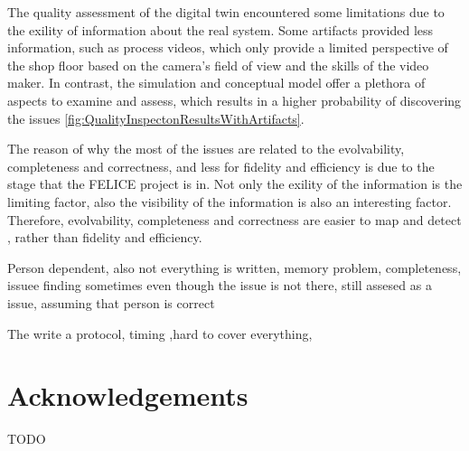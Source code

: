 \documentclass{llncs}
\begin{document}
    The quality assessment of the digital twin encountered some limitations due to the exility of information about the real system. Some artifacts provided less information, 
    such as process videos, which only provide a limited perspective of the shop floor based on the camera's field of view and the skills of the video maker. 
    In contrast, the simulation and conceptual model offer a plethora of aspects to examine and assess, which results in a higher probability of discovering the issues \ref{fig:QualityInspectonResultsWithArtifacts}.

    The reason of why the  most of the issues are related to the evolvability, 
    completeness and correctness, and less for fidelity and efficiency is due to the stage that the FELICE project is in. Not only the exility of the information is the limiting factor, also the visibility of the information 
    is also an interesting factor. Therefore, evolvability, completeness and correctness are easier to map and detect , rather than fidelity and efficiency. 

    Person dependent, also not everything is written, memory problem, completeness, 
    issuee finding sometimes even though the issue is not there, still assesed as a issue, assuming that person is correct

    The write a protocol, timing ,hard to cover everything, 
    

    
    \section*{Acknowledgements}
    TODO

    
    
\end{document}
